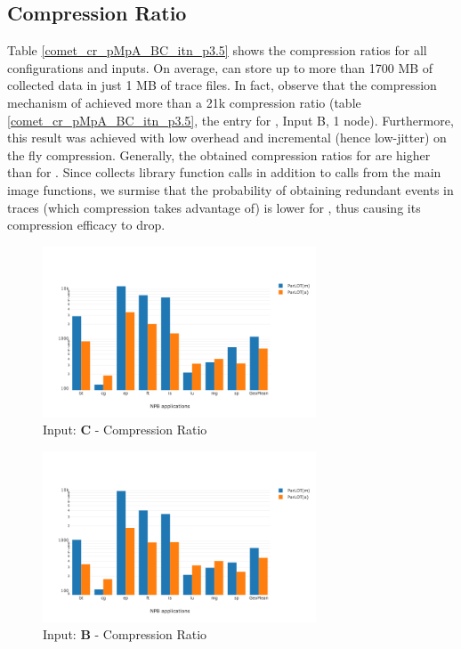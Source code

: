   
\subsection{Compression Ratio}
\label{subsec:cr}

Table \ref{comet_cr_pMpA_BC_itn_p3.5} shows the compression ratios for all configurations and inputs. 
On average, \parlot can store up to more than 1700 MB of collected data in just 1 MB of trace files. 
In fact, observe that the compression mechanism of
\parlot achieved more than a 21k compression ratio (table \ref{comet_cr_pMpA_BC_itn_p3.5}, 
the entry for \parlotm, Input B, 1 node).
%
Furthermore, this result was achieved with low overhead and incremental (hence low-jitter) 
on the fly compression.
%
Generally, the obtained
compression ratios for \parlotm are higher than for \parlota. 
%
Since \parlota  collects library function calls in addition to calls from
the main image functions, 
we surmise that the probability of obtaining
redundant events in traces (which compression takes advantage of)
is lower for \parlota, thus causing its compression efficacy to drop.

  



\begin{figure}[t]
\centering
\includegraphics[width=3.2in]{figs.comet.newMed/comet_chartAvg_cr_C_p3_5.png}
\caption{ Input: \textbf{C}  - Compression Ratio
}
\label{comet_chartAvg_cr_C_p3_5}
\end{figure}


\begin{figure}[t]
\centering
\includegraphics[width=3.2in]{figs.comet.newMed/comet_chartAvg_cr_B_p3_5.png}
\caption{ Input: \textbf{B}  - Compression Ratio
}
\label{comet_chartAvg_cr_B_p3_5}
\end{figure}
  
